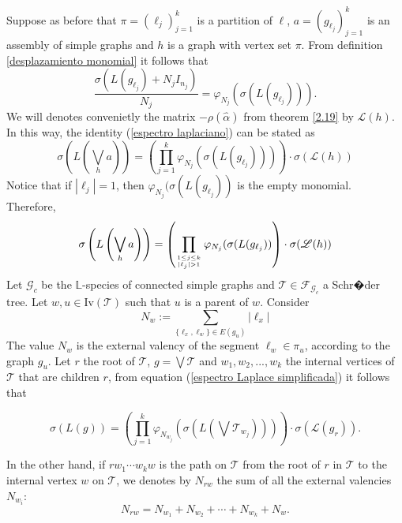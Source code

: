 \documentclass[11pt]{article}
\theoremstyle{definition}
\begin{document}
Suppose as before that $\pi=(\ell_j)^k_{j=1}$ is a partition of $\ell$, $a=(g_{\ell_j})^k_{j=1}$ is an assembly of simple graphs and $h$ is a graph with vertex set $\pi$. From definition \ref{desplazamiento monomial} it follows that
\begin{equation}
\dfrac{\sigma(L(g_{\ell_j})+N_jI_{n_j})}{N_j}=\varphi_{N_j}(\sigma(L(g_{\ell_j}))).
\end{equation}
We will denotes convenietly the matrix $-\rho(\hat{\alpha})$ from theorem \ref{2.19} by $\mathscr{L}(h)$. In this way, the identity (\ref{espectro laplaciano}) can be stated as
\begin{equation}\label{varphi laplaciano}
\sigma\left( L\left(\bigvee_{h} a \right)\right)=\left(\prod^k_{j=1} \varphi_{N_j}(\sigma(L(g_{\ell_j})))\right)\cdot \sigma(\mathscr{L}(h))
\end{equation}
Notice that if $|\ell_j|=1$, then  $\varphi_{N_j}(\sigma(L(g_{\ell_j}))$ is the empty monomial. Therefore,
\begin{equation}\label{espectro Laplace simplificada}
\sigma\left( L\left(\bigvee_{h} a\right) \right)=\left(\prod_{1\leq j \leq k \atop |\ell_j|>1 } \varphi_{N_j}(\sigma(L(g_{\ell_j}))\right)\cdot \sigma(\mathscr{L}(h))
\end{equation}
Let $\mathscr{G}_c$ be the $\mathbb{L}$-species of connected simple graphs and $\mathscr{T}\in \mathscr{F}_{\mathscr{G}_c}$ a Schr�der tree. Let $w,u\in \mathrm{Iv}(\mathscr{T})$ such that $u$ is a parent of $w$. Consider
\[N_w:=\sum_{\{\ell_x,\ell_w\} \in E(g_u)} |\ell_x|\]
The value $N_{w}$ is the external valency of the segment $\ell_w\in \pi_{u}$, according to the graph $g_u$. Let $r$ the root of $\mathscr{T}$,
$g=\bigvee \mathscr{T}$ and $w_1, w_2,..., w_k$ the internal vertices of $\mathscr{T}$ that are children $r$, from equation (\ref{espectro Laplace simplificada}) it follows that

\begin{equation}\label{espectro Laplace nivel 1}
\sigma (L(g))=\left(\prod^k_{j=1} \varphi_{N_{w_j}}\left(\sigma\left(L\left(\bigvee \mathscr{T}_{w_j}\right)\right)\right)\right)\cdot \sigma(\mathscr{L}(g_r)).
\end{equation}

In the other hand, if $r w_1\cdots w_k w$ is the path on $\mathscr{T}$ from the root of $r$ in $\mathscr{T}$
to the internal vertex $w$ on $\mathscr{T}$, we denotes by $N_{rw}$ the sum of all the external valencies $N_{w_i}$:
\[N_{rw}=N_{w_1}+N_{w_2}+\cdots + N_{w_k} + N_w.\]
\end{document}
